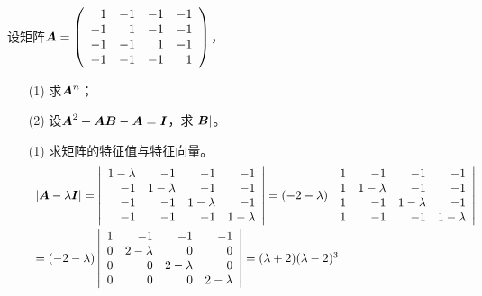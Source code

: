\begin{frame}

\begin{li}[2012-2013第二学期]
设矩阵$\boldsymbol{A}=\left(
\begin{array}{rrrr}
1&-1&-1&-1\\
-1&1&-1&-1\\
-1&-1&1&-1\\
-1&-1&-1&1
\end{array}
\right)$，
\begin{itemize}
\item[(1)] 求$\boldsymbol{A}^n$；
\item[(2)] 设$\boldsymbol{A}^2+\boldsymbol{A}\boldsymbol{B}-\boldsymbol{A}=\boldsymbol{I}$，求$|\boldsymbol{B}|$。
\end{itemize}
\end{li}
\pause

\begin{jie}
\begin{itemize}
\item[(1)] 求矩阵的特征值与特征向量。
  $$
  \begin{array}{l}
    |\boldsymbol{A}-\lambda\boldsymbol{I}|=\left|
    \begin{array}{rrrr}
      1-\lambda&-1&-1&-1\\
      -1&1-\lambda&-1&-1\\
      -1&-1&1-\lambda&-1\\
      -1&-1&-1&1-\lambda
    \end{array}
    \right|
    =(-2-\lambda)\left|
    \begin{array}{rrrr}
      1&-1&-1&-1\\
      1&1-\lambda&-1&-1\\
      1&-1&1-\lambda&-1\\
      1&-1&-1&1-\lambda
    \end{array}
    \right|\\[0.3in]=(-2-\lambda)\left|
    \begin{array}{rrrr}
      1&-1&-1&-1\\
      0&2-\lambda&0&0\\
      0&0& 2-\lambda&0\\
      0&0& 0 &2-\lambda
    \end{array}
    \right|   = (\lambda+2)(\lambda-2)^3
  \end{array}
$$
\end{itemize}
\end{jie}

\end{frame}


